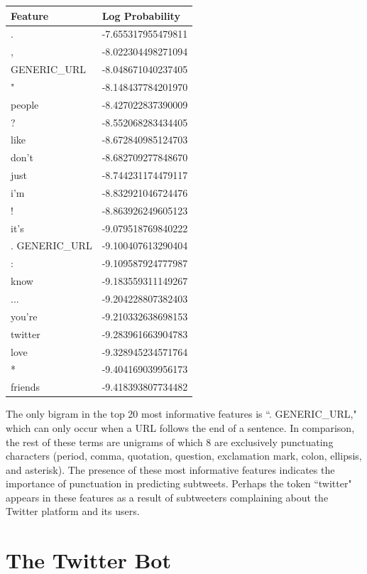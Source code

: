 \documentclass[11pt, twoside, reqno]{book}
\begin{document}
\begin{center}
\begin{tabular}{ | p{8em} | p{9em} | }
\hline
Feature & Log Probability    \\ \hline
.       & -7.655317955479811 \\
,       & -8.022304498271094 \\
GENERIC\_URL& -8.048671040237405 \\
"       & -8.148437784201970 \\
people  & -8.427022837390009 \\
?       & -8.552068283434405 \\
like    & -8.672840985124703 \\
don't   & -8.682709277848670 \\
just    & -8.744231174479117 \\
i'm     & -8.832921046724476 \\
!       & -8.863926249605123 \\
it's    & -9.079518769840222 \\
. GENERIC\_URL   & -9.100407613290404 \\
:       & -9.109587924777987 \\
know    & -9.183559311149267 \\
...     & -9.204228807382403 \\
you're  & -9.210332638698153 \\
twitter & -9.283961663904783 \\
love    & -9.328945234571764 \\
*       & -9.404169039956173 \\
friends & -9.418393807734482 \\
\hline
\end{tabular}
\end{center}

\noindent
The only bigram in the top 20 most informative features is ``. GENERIC\_URL," which can only occur when a URL follows the end of a sentence. In comparison, the rest of these terms are unigrams of which 8 are exclusively punctuating characters (period, comma, quotation, question, exclamation mark, colon, ellipsis, and asterisk). The presence of these most informative features indicates the importance of punctuation in predicting subtweets. Perhaps the token ``twitter" appears in these features as a result of subtweeters complaining about the Twitter platform and its users.

\section{The Twitter Bot}
\label{the_twitter_bot}
\end{document}
